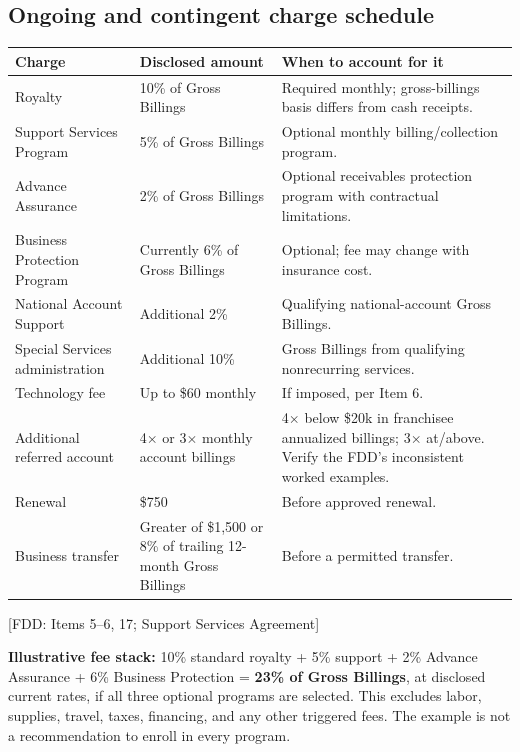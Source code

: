 \documentclass[10pt,letterpaper]{article}
\newcommand{\FDD}[1]{\textsf{\footnotesize\color{Muted} [FDD: #1]}}
\begin{document}
\subsection{Ongoing and contingent charge schedule}
{\small
\begin{tabularx}{\linewidth}{@{}p{.265\linewidth}p{.21\linewidth}Y@{}}
\toprule
\textbf{Charge} & \textbf{Disclosed amount} & \textbf{When to account for it}\\\midrule
Royalty & 10\% of Gross Billings & Required monthly; gross-billings basis differs from cash receipts.\\
Support Services Program & 5\% of Gross Billings & Optional monthly billing/collection program.\\
Advance Assurance & 2\% of Gross Billings & Optional receivables protection program with contractual limitations.\\
Business Protection Program & Currently 6\% of Gross Billings & Optional; fee may change with insurance cost.\\
National Account Support & Additional 2\% & Qualifying national-account Gross Billings.\\
Special Services administration & Additional 10\% & Gross Billings from qualifying nonrecurring services.\\
Technology fee & Up to \$60 monthly & If imposed, per Item 6.\\
Additional referred account & 4\(\times\) or 3\(\times\) monthly account billings & 4\(\times\) below \$20k in franchisee annualized billings; 3\(\times\) at/above. Verify the FDD's inconsistent worked examples.\\
Renewal & \$750 & Before approved renewal.\\
Business transfer & Greater of \$1,500 or 8\% of trailing 12-month Gross Billings & Before a permitted transfer.\\
\bottomrule
\end{tabularx}}
\FDD{Items 5--6, 17; Support Services Agreement}

\begin{noteBox}
\textbf{Illustrative fee stack:} 10\% standard royalty + 5\% support + 2\%
Advance Assurance + 6\% Business Protection = \textbf{23\% of Gross
Billings}, at disclosed current rates, if all three optional programs are
selected. This excludes labor, supplies, travel, taxes, financing, and any
other triggered fees. The example is not a recommendation to enroll in every
program.
\end{noteBox}
\end{document}
